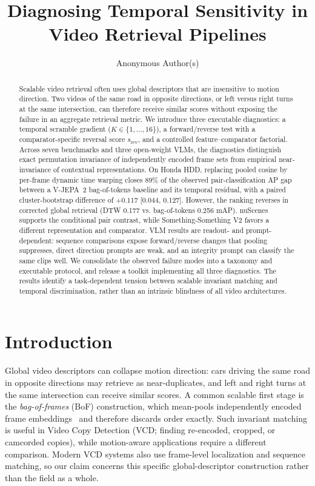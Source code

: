 \documentclass{article}
\title{Diagnosing Temporal Sensitivity in Video Retrieval Pipelines}
\author{Anonymous Author(s)}
\theoremstyle{remark}
\begin{document}
\maketitle

\begin{abstract}
Scalable video retrieval often uses global descriptors that are insensitive to motion
direction. Two videos of the same road in opposite directions, or left versus right turns
at the same intersection, can therefore receive similar scores without exposing the
failure in an aggregate retrieval metric. We introduce three executable diagnostics: a
temporal scramble gradient ($K\!\in\!\{1,\ldots,16\}$), a forward/reverse test with a
comparator-specific reversal score $s_\text{rev}$, and a controlled feature--comparator
factorial. Across seven benchmarks and three open-weight VLMs, the diagnostics distinguish
exact permutation invariance of independently encoded frame sets from empirical
near-invariance of contextual representations. On Honda HDD, replacing pooled cosine by
per-frame dynamic time warping closes 89\% of the observed pair-classification AP gap between a
V-JEPA~2 bag-of-tokens baseline and its temporal residual, with a paired cluster-bootstrap
difference of $+0.117$ [0.044, 0.127]. However, the ranking reverses in corrected global
retrieval (DTW 0.177 vs. bag-of-tokens 0.256 mAP). nuScenes supports the conditional pair
contrast, while Something-Something V2 favors a different representation and comparator.
VLM results are readout- and prompt-dependent: sequence comparisons expose
forward/reverse changes that pooling suppresses, direct direction prompts are weak, and
an integrity prompt can classify the same clips well. We consolidate the observed failure
modes into a taxonomy and executable protocol, and release a toolkit implementing all
three diagnostics. The results identify a task-dependent tension between scalable
invariant matching and temporal discrimination, rather than an intrinsic blindness of
all video architectures.
\end{abstract}

\section{Introduction}

Global video descriptors can collapse motion direction: cars driving the same road in opposite directions may retrieve as near-duplicates, and left and right turns at the same intersection can receive similar scores. A common scalable first stage is the \emph{bag-of-frames} (BoF) construction, which mean-pools independently encoded frame embeddings~\cite{faiss, semdedup} and therefore discards order exactly. Such invariant matching is useful in Video Copy Detection (VCD; finding re-encoded, cropped, or camcorded copies), while motion-aware applications require a different comparison. Modern VCD systems also use frame-level localization and sequence matching, so our claim concerns this specific global-descriptor construction rather than the field as a whole.
\end{document}
